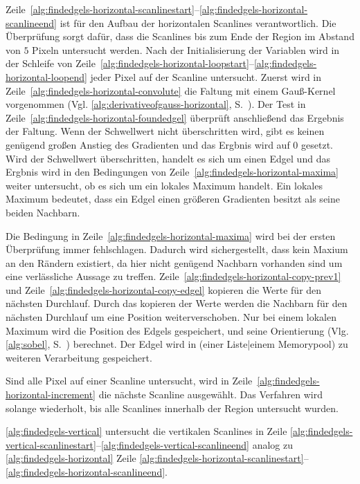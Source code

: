 Zeile~\ref{alg:findedgels-horizontal-scanlinestart}--\ref{alg:findedgels-horizontal-scanlineend} ist für den Aufbau der
 horizontalen Scanlines verantwortlich. Die Überprüfung sorgt dafür, dass die Scanlines bis zum Ende der Region im
 Abstand von $5$ Pixeln untersucht werden. Nach der Initialisierung der Variablen wird in der Schleife von
 Zeile~\ref{alg:findedgels-horizontal-loopstart}--\ref{alg:findedgels-horizontal-loopend} jeder Pixel auf der Scanline
 untersucht. Zuerst wird in Zeile~\ref{alg:findedgels-horizontal-convolute} die Faltung mit einem Gauß-Kernel
 vorgenommen (Vgl. \autoref{alg:derivativeofgauss-horizontal}, S.~\pageref{alg:derivativeofgauss-horizontal}). Der Test
 in Zeile~\ref{alg:findedgels-horizontal-foundedgel} überprüft anschließend das Ergebnis der Faltung. Wenn der
 Schwellwert nicht überschritten wird, gibt es keinen genügend großen Anstieg des Gradienten und das Ergbnis wird auf
 $0$ gesetzt. Wird der Schwellwert überschritten, handelt es sich um einen Edgel und das Ergbnis wird in den
 Bedingungen von Zeile~\ref{alg:findedgels-horizontal-maxima} weiter untersucht, ob es sich um ein lokales Maximum
 handelt. Ein lokales Maximum bedeutet, dass ein Edgel einen größeren Gradienten besitzt als seine beiden Nachbarn.

Die Bedingung in Zeile~\ref{alg:findedgels-horizontal-maxima} wird bei der ersten Überprüfung immer fehlschlagen.
 Dadurch wird sichergestellt, dass kein Maxium an den Rändern existiert, da hier nicht genügend Nachbarn vorhanden sind
 um eine verlässliche Aussage zu treffen. Zeile~\ref{alg:findedgels-horizontal-copy-prev1} und
 Zeile~\ref{alg:findedgels-horizontal-copy-edgel} kopieren die Werte für den nächsten Durchlauf. Durch das kopieren der
 Werte werden die Nachbarn für den nächsten Durchlauf um eine Position weiterverschoben. Nur bei einem lokalen Maximum
 wird die Position des Edgels gespeichert, und seine Orientierung (Vlg. \autoref{alg:sobel},
 S.~\pageref{alg:sobel}) berechnet. Der Edgel wird in (einer Liste|einem Memorypool) zu weiteren Verarbeitung
 gespeichert.

Sind alle Pixel auf einer Scanline untersucht, wird in Zeile~\ref{alg:findedgels-horizontal-increment} die nächste
 Scanline ausgewählt. Das Verfahren wird solange wiederholt, bis alle Scanlines innerhalb der Region untersucht wurden.

\autoref{alg:findedgels-vertical} untersucht die vertikalen Scanlines in Zeile
 \ref{alg:findedgels-vertical-scanlinestart}--\ref{alg:findedgels-vertical-scanlineend} analog zu
 \autoref{alg:findedgels-horizontal} Zeile
 \ref{alg:findedgels-horizontal-scanlinestart}--\ref{alg:findedgels-horizontal-scanlineend}.

